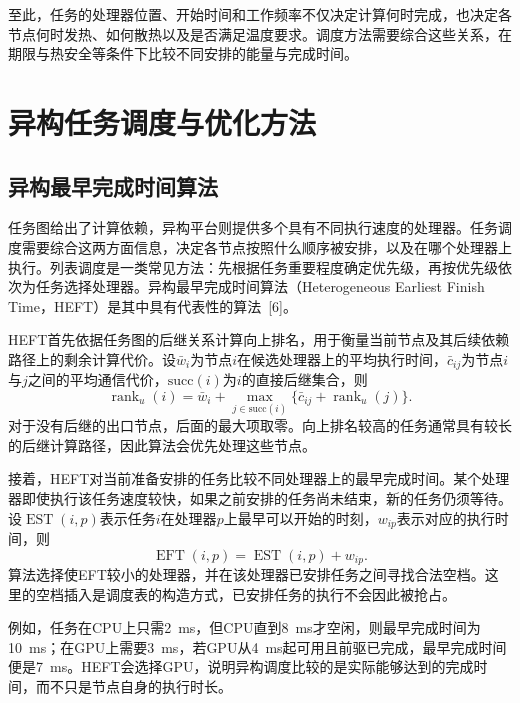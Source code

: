 至此，任务的处理器位置、开始时间和工作频率不仅决定计算何时完成，也决定各节点何时发热、如何散热以及是否满足温度要求。调度方法需要综合这些关系，在期限与热安全等条件下比较不同安排的能量与完成时间。

\section{异构任务调度与优化方法}

\subsection{异构最早完成时间算法}

任务图给出了计算依赖，异构平台则提供多个具有不同执行速度的处理器。任务调度需要综合这两方面信息，决定各节点按照什么顺序被安排，以及在哪个处理器上执行。列表调度是一类常见方法：先根据任务重要程度确定优先级，再按优先级依次为任务选择处理器。异构最早完成时间算法（Heterogeneous Earliest Finish Time，HEFT）是其中具有代表性的算法~[6]。

HEFT首先依据任务图的后继关系计算向上排名，用于衡量当前节点及其后续依赖路径上的剩余计算代价。设$\bar w_i$为节点$i$在候选处理器上的平均执行时间，$\bar c_{ij}$为节点$i$与$j$之间的平均通信代价，$\mathrm{succ}(i)$为$i$的直接后继集合，则
\begin{equation}\label{eq:ch2-heft-rank}
 \operatorname{rank}_u(i)=\bar w_i+
 \max_{j\in\mathrm{succ}(i)}
 \bigl\{\bar c_{ij}+\operatorname{rank}_u(j)\bigr\}.
\end{equation}
对于没有后继的出口节点，后面的最大项取零。向上排名较高的任务通常具有较长的后继计算路径，因此算法会优先处理这些节点。

接着，HEFT对当前准备安排的任务比较不同处理器上的最早完成时间。某个处理器即使执行该任务速度较快，如果之前安排的任务尚未结束，新的任务仍须等待。设$\operatorname{EST}(i,p)$表示任务$i$在处理器$p$上最早可以开始的时刻，$w_{ip}$表示对应的执行时间，则
\begin{equation}\label{eq:ch2-heft-eft}
 \operatorname{EFT}(i,p)
 =\operatorname{EST}(i,p)+w_{ip}.
\end{equation}
算法选择使EFT较小的处理器，并在该处理器已安排任务之间寻找合法空档。这里的空档插入是调度表的构造方式，已安排任务的执行不会因此被抢占。

例如，任务在CPU上只需2~ms，但CPU直到8~ms才空闲，则最早完成时间为10~ms；在GPU上需要3~ms，若GPU从4~ms起可用且前驱已完成，最早完成时间便是7~ms。HEFT会选择GPU，说明异构调度比较的是实际能够达到的完成时间，而不只是节点自身的执行时长。

